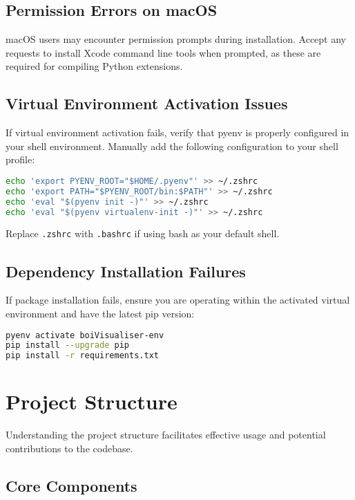 \documentclass[11pt,a4paper]{article}
\begin{document}
\subsection{Permission Errors on macOS}

macOS users may encounter permission prompts during installation. Accept any requests to install Xcode command line tools when prompted, as these are required for compiling Python extensions.

\subsection{Virtual Environment Activation Issues}

If virtual environment activation fails, verify that pyenv is properly configured in your shell environment. Manually add the following configuration to your shell profile:

\begin{lstlisting}[language=bash]
echo 'export PYENV_ROOT="$HOME/.pyenv"' >> ~/.zshrc
echo 'export PATH="$PYENV_ROOT/bin:$PATH"' >> ~/.zshrc  
echo 'eval "$(pyenv init -)"' >> ~/.zshrc
echo 'eval "$(pyenv virtualenv-init -)"' >> ~/.zshrc
\end{lstlisting}

Replace \texttt{.zshrc} with \texttt{.bashrc} if using bash as your default shell.

\subsection{Dependency Installation Failures}

If package installation fails, ensure you are operating within the activated virtual environment and have the latest pip version:

\begin{lstlisting}[language=bash]
pyenv activate boiVisualiser-env
pip install --upgrade pip
pip install -r requirements.txt
\end{lstlisting}

\section{Project Structure}

Understanding the project structure facilitates effective usage and potential contributions to the codebase.

\subsection{Core Components}
\end{document}
